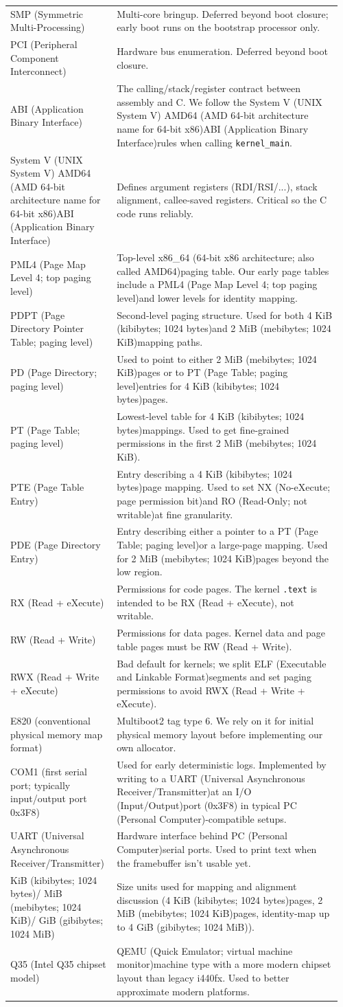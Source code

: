 \documentclass[11pt]{article}
\newcommand{\ABI}{ABI (Application Binary Interface)}
\newcommand{\AMDsixtyfour}{AMD64 (AMD 64-bit architecture name for 64-bit x86)}
\newcommand{\COMone}{COM1 (first serial port; typically input/output port 0x3F8)}
\newcommand{\EEightTwoZero}{E820 (conventional physical memory map format)}
\newcommand{\ELF}{ELF (Executable and Linkable Format)}
\newcommand{\GiB}{GiB (gibibytes; 1024 MiB)}
\newcommand{\IO}{I/O (Input/Output)}
\newcommand{\KiB}{KiB (kibibytes; 1024 bytes)}
\newcommand{\MiB}{MiB (mebibytes; 1024 KiB)}
\newcommand{\NX}{NX (No-eXecute; page permission bit)}
\newcommand{\PCI}{PCI (Peripheral Component Interconnect)}
\newcommand{\PC}{PC (Personal Computer)}
\newcommand{\PD}{PD (Page Directory; paging level)}
\newcommand{\PDE}{PDE (Page Directory Entry)}
\newcommand{\PDPT}{PDPT (Page Directory Pointer Table; paging level)}
\newcommand{\PMLfour}{PML4 (Page Map Level 4; top paging level)}
\newcommand{\PT}{PT (Page Table; paging level)}
\newcommand{\PTE}{PTE (Page Table Entry)}
\newcommand{\QEMU}{QEMU (Quick Emulator; virtual machine monitor)}
\newcommand{\QThirtyFive}{Q35 (Intel Q35 chipset model)}
\newcommand{\RO}{RO (Read-Only; not writable)}
\newcommand{\RW}{RW (Read + Write)}
\newcommand{\RWX}{RWX (Read + Write + eXecute)}
\newcommand{\RX}{RX (Read + eXecute)}
\newcommand{\SMP}{SMP (Symmetric Multi-Processing)}
\newcommand{\SysV}{System V (UNIX System V) \AMDsixtyfour ABI (Application Binary Interface)}
\newcommand{\UART}{UART (Universal Asynchronous Receiver/Transmitter)}
\newcommand{\xEightySixSixtyFour}{x86\_64 (64-bit x86 architecture; also called AMD64)}
\begin{document}
\begin{longtable}{@{}p{0.30\linewidth}p{0.66\linewidth}@{}}
\SMP & Multi-core bringup. Deferred beyond boot closure; early boot runs on the bootstrap processor only. \\
\PCI & Hardware bus enumeration. Deferred beyond boot closure. \\
\ABI & The calling/stack/register contract between assembly and C. We follow the \SysV rules when calling \texttt{kernel\_main}. \\
\SysV & Defines argument registers (RDI/RSI/...), stack alignment, callee-saved registers. Critical so the C code runs reliably. \\
\PMLfour & Top-level \xEightySixSixtyFour paging table. Our early page tables include a \PMLfour and lower levels for identity mapping. \\
\PDPT & Second-level paging structure. Used for both 4 \KiB and 2 \MiB mapping paths. \\
\PD & Used to point to either 2 \MiB pages or to \PT entries for 4 \KiB pages. \\
\PT & Lowest-level table for 4 \KiB mappings. Used to get fine-grained permissions in the first 2 \MiB. \\
\PTE & Entry describing a 4 \KiB page mapping. Used to set \NX and \RO at fine granularity. \\
\PDE & Entry describing either a pointer to a \PT or a large-page mapping. Used for 2 \MiB pages beyond the low region. \\
\RX & Permissions for code pages. The kernel \texttt{.text} is intended to be \RX, not writable. \\
\RW & Permissions for data pages. Kernel data and page table pages must be \RW. \\
\RWX & Bad default for kernels; we split \ELF segments and set paging permissions to avoid \RWX. \\
\EEightTwoZero & Multiboot2 tag type 6. We rely on it for initial physical memory layout before implementing our own allocator. \\
\COMone & Used for early deterministic logs. Implemented by writing to a \UART at an \IO port (0x3F8) in typical \PC-compatible setups. \\
\UART & Hardware interface behind \PC serial ports. Used to print text when the framebuffer isn’t usable yet. \\
\KiB / \MiB / \GiB & Size units used for mapping and alignment discussion (4 \KiB pages, 2 \MiB pages, identity-map up to 4 \GiB). \\
\QThirtyFive & \QEMU machine type with a more modern chipset layout than legacy i440fx. Used to better approximate modern platforms. \\
\bottomrule
\end{longtable}
\end{document}
